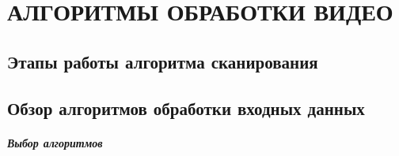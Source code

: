 \chapter{АЛГОРИТМЫ ОБРАБОТКИ ВИДЕО}\label{chap:algorithms}
    \section{Этапы работы алгоритма сканирования}
    
    \section{Обзор алгоритмов обработки входных данных}
        \paragraph{Выбор алгоритмов}